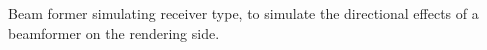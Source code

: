 Beam former simulating receiver type, to simulate the directional
effects of a beamformer on the rendering side.
